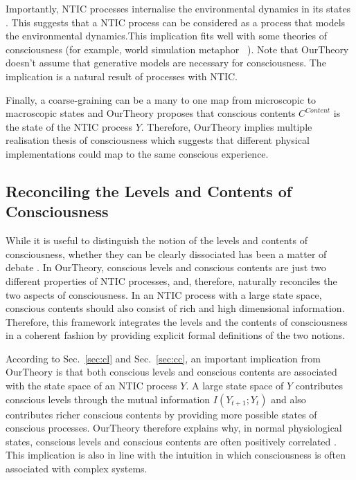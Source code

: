 \documentclass[utf8]{article}
\begin{document}
    		Importantly, NTIC processes internalise the environmental dynamics in its states \citep[also see P.~4][]{BERTSCHINGER.2006}. This suggests that a NTIC process can be considered as a process that models the environmental dynamics.This implication fits well with some theories of consciousness (for example, world simulation metaphor ~\citep{revonsuo2006inner}). Note that \ac{OurTheory} doesn't assume that generative models are necessary for consciousness. The implication is a natural result of processes with NTIC. 
            
            Finally, a coarse-graining can be a many to one map from microscopic to macroscopic states and \ac{OurTheory} proposes that conscious contents $C^{Content}$ is the state of the NTIC process $Y$. Therefore, \ac{OurTheory} implies multiple realisation thesis of consciousness \citep{putnam1967psychological,bechtel1999multiple} which suggests that different physical implementations could map to the same conscious experience.
            
            
	    \subsection{Reconciling the Levels and Contents of Consciousness}\label{sec:reconcile}
    	    While it is useful to distinguish the notion of the levels and contents of consciousness, whether they can be clearly dissociated has been a matter of debate \citep{bayne2016there, Fazekas2016}. In \ac{OurTheory}, conscious levels and conscious contents are just two different properties of NTIC processes, and, therefore, naturally reconciles the two aspects of consciousness. In an NTIC process with a large state space, conscious contents should also consist of rich and high dimensional information. Therefore, this framework integrates the levels and the contents of consciousness in a coherent fashion by providing explicit formal definitions of the two notions.  
    	    
    	    
    	    According to Sec.~\ref{sec:cl} and Sec.~\ref{sec:cc}, an important implication from \ac{OurTheory} is that both conscious levels and conscious contents are associated with the state space of an NTIC process $Y$. A large state space of $Y$ contributes conscious levels through the mutual information $I(Y_{t+1};Y_{t})$ and also contributes richer conscious contents by providing more possible states of conscious processes. 
    	    \ac{OurTheory} therefore explains why, in normal physiological states, conscious levels and conscious contents are often positively correlated \citep{laureys2005neural}. This implication is also in line with the intuition in which consciousness is often associated with complex systems.
    			
\end{document}
